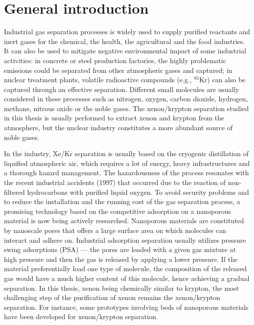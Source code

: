 
\chapter*{General introduction}

Industrial gas separation processes is widely used to supply purified reactants and inert gases for the chemical, the health, the agricultural and the food industries. It can also be used to mitigate negative environmental impact of some industrial activities: in concrete or steel production factories, the highly problematic  emissions could be separated from other atmospheric gases and captured; in nuclear treatment plants, volatile radioactive compounds (e.g., $^{85}$Kr) can also be captured through an effective separation. Different small molecules are usually considered in these processes such as nitrogen, oxygen, carbon
dioxide, hydrogen, methane, nitrous oxide or the noble gases. The xenon/krypton separation studied in this thesis is usually performed to extract xenon and krypton from the atmosphere,\autocite{kerry2007industrial} but the nuclear industry constitutes a more abundant source of noble gases.\autocite{Banerjee_2014} 

In the industry, Xe/Kr separation is usually based on the cryogenic distillation of liquified atmospheric air, which requires a lot of energy, heavy infrastructures and a thorough hazard management. The hazardousness of the process resonates with the recent industrial accidents (1997) that occurred due to the reaction of non-filtered hydrocarbons with purified liquid oxygen.\autocite{distill_accident,distill_accident2} To avoid security problems and to reduce the installation and the running cost of the gas separation process, a promising technology based on the competitive adsorption on a nanoporous material is now being actively researched. Nanoporous materials are constituted by nanoscale pores that offers a large surface area on which molecules can interact and adhere on. Industrial adsorption separation usually utilizes pressure swing adsorptions (PSA) --- the pores are loaded with a given gas mixture at high pressure and then the gas is released by applying a lower pressure. If the material preferentially load one type of molecule, the composition of the released gas would have a much higher content of this molecule, hence achieving a gradual separation. In this thesis, xenon being chemically similar to krypton, the most challenging step of the purification of xenon remains the xenon/krypton separation. For instance, some prototypes involving beds of nanoporous materials have been developed for xenon/krypton separation.\autocite{Banerjee2018} 


